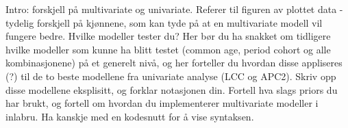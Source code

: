 \textcolor{myDarkGreen}{
Intro: forskjell på multivariate og univariate. Referer til figuren av plottet data - tydelig forskjell på kjønnene, som kan tyde på at en multivariate modell vil fungere bedre. 
\newline \newline 
Hvilke modeller tester du? Her bør du ha snakket om tidligere hvilke modeller som kunne ha blitt testet (common age, period cohort og alle kombinasjonene) på et generelt nivå, og her forteller du hvordan disse appliseres (?) til de to beste modellene fra univariate analyse (LCC og APC2). Skriv opp disse modellene eksplisitt, og forklar notasjonen din. 
\newline \newline
Fortell hva slags priors du har brukt, og fortell om hvordan du implementerer multivariate modeller i inlabru. Ha kanskje med en kodesnutt for å vise syntaksen. 
}

